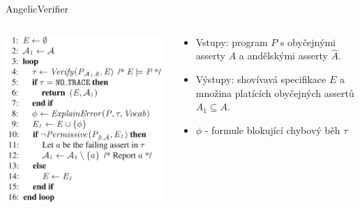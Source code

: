 \documentclass[11pt]{beamer}
\begin{document}
\begin{frame}{AngelicVerifier}
\begin{columns}

\begin{column}{0.5\textwidth}
\pause \includegraphics[width=0.9\linewidth]{img/angelicVerifyShort.png}
\end{column}

\begin{column}{0.5\textwidth}
\begin{itemize}
\pause \item Vstupy: program $P$ s obyčejnými asserty $A$ a andělskými asserty $\hat{A}$.
\pause \item Výstupy: shovívavá specifikace $E$ a množina platících obyčejných assertů $A_1 \subseteq A$.
\pause \item $\phi$ - formule blokující chybový běh $\tau$
\end{itemize}
\end{column}

\end{columns}
\end{frame}
\end{document}
